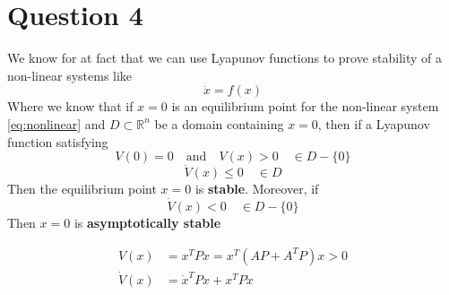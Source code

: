 \chapter{Question 4}
We know for at fact that we can use Lyapunov functions to prove stability of a non-linear systems like
\begin{equation}
        \dot{x} = f(x)
        \label{eq:nonlinear}
\end{equation}
Where we know that if $x = 0$ is an equilibrium point for the non-linear system \ref{eq:nonlinear} and $D \subset \mathbb{R}^n$ be a domain containing $x = 0$, then if a Lyapunov function satisfying
\begin{equation}
        V(0) = 0 \quad \text{and} \quad V(x) > 0 \quad \in D - \{0\}
\end{equation}
\begin{equation}
        \dot{V}(x) \leq 0 \quad \in D
\end{equation}
Then the equilibrium point $x = 0$ is \textbf{stable}. Moreover, if
\begin{equation}
        \dot{V}(x) < 0 \quad \in D - \{0\}
\end{equation}
Then $x = 0$ is \textbf{asymptotically stable}

\begin{equation}
        \begin{split}
                V(x) &= x^T P x = x^T(AP + A^T P)x > 0 \\
                \dot{V}(x) &= \dot{x}^T P x + x^T P \dot{x}
        \end{split}
\end{equation}
